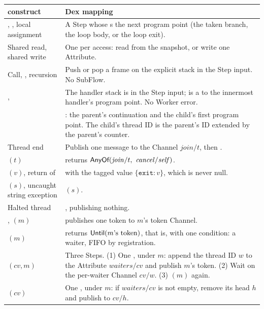 \begin{table}[t]
\centering
\small
\begin{tabularx}{\textwidth}{@{}P{3.5cm}L@{}}
\toprule
\Lang{} construct & Dex mapping \\
\midrule
{}, , local assignment & A Step whose  s
  the next program point (the taken branch, the loop body, or the loop
  exit). \\
Shared read, shared write & One  per access: read from the
  snapshot, or write one Attribute. \\
Call, , recursion & Push or pop a frame on the explicit stack in
  the Step input. No SubFlow. \\
,  & The handler stack is in the Step input; 
  is a  to the innermost handler's program point. No Worker
  error. \\
 & : the parent's continuation and the child's first
  program point. The child's thread ID is the parent's ID extended by the
  parent's counter. \\
Thread end & Publish one message to the Channel $\mathit{join}/t$, then
  . \\
$(t)$ &  returns
  $\kw{AnyOf}(\mathit{join}/t,\ \mathit{cancel}/\mathit{self})$. \\
$(v)$, return of  &  with the tagged
  value $\{\texttt{exit}: v\}$, which is never null. \\
$(s)$, uncaught string exception & $(s)$. \\
Halted thread & , publishing nothing. \\
, $(m)$ &  publishes one token to
  $m$'s token Channel. \\
$(m)$ &  returns $\textsf{Until}(m\text{'s token})$, that
  is,  with one condition: a  waiter, FIFO by
  registration. \\
$(\mathit{cv}, m)$ & Three Steps. (1) One , under $m$:
  append the thread ID $w$ to the Attribute $\mathit{waiters}/\mathit{cv}$
  and publish $m$'s token. (2) Wait on the per-waiter Channel
  $\mathit{cv}/w$. (3) $(m)$ again. \\
$(\mathit{cv})$ & One , under $m$: if
  $\mathit{waiters}/\mathit{cv}$ is not empty, remove its head $h$ and
  publish to $\mathit{cv}/h$. \\

\end{tabularx}
\end{table}
